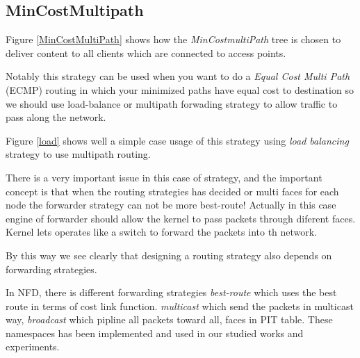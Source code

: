 \subsection{MinCostMultipath}
Figure \ref{MinCostMultiPath} shows how the \textit{MinCostmultiPath} tree is chosen to deliver content to all clients which are connected to access points.
 
Notably this strategy can be used when you want to do a \textit{Equal Cost Multi Path} (ECMP) routing in which your minimized paths have equal cost to destination so we should use load-balance or multipath forwading strategy to allow traffic to pass along the network. 

Figure \ref{load} shows well a simple case usage of this strategy using \textit{load balancing} strategy to use multipath routing.

There is a very important issue in this case of strategy, and the important concept is that when the routing strategies has decided or multi faces for each node the forwarder strategy can not be more best-route! Actually in this case engine of forwarder should allow the kernel to pass packets through diferent faces. Kernel lets operates like a switch to forward the packets into th network.

By this way we see clearly that designing a routing strategy also depends on forwarding strategies. 

In NFD, there is different forwarding strategies \textit{best-route} which uses the best route in terms of cost link function. \textit{multicast} which send the packets in multicast way, \textit{broadcast} which pipline all packets toward all, faces in PIT table. These namespaces has been implemented and used in our studied works and experiments.

